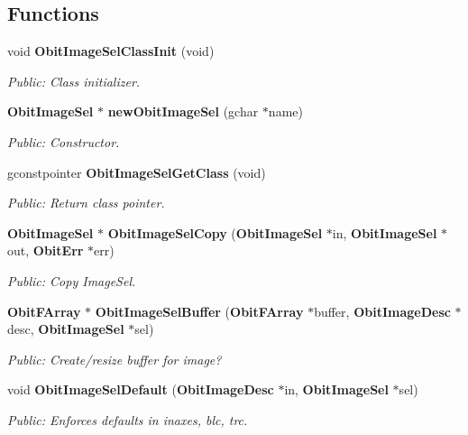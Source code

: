 \subsection*{Functions}
\begin{CompactItemize}
\item 
void {\bf Obit\-Image\-Sel\-Class\-Init} (void)
\begin{CompactList}\small\item\em Public: Class initializer. \item\end{CompactList}\item 
{\bf Obit\-Image\-Sel} $\ast$ {\bf new\-Obit\-Image\-Sel} (gchar $\ast$name)
\begin{CompactList}\small\item\em Public: Constructor. \item\end{CompactList}\item 
gconstpointer {\bf Obit\-Image\-Sel\-Get\-Class} (void)
\begin{CompactList}\small\item\em Public: Return class pointer. \item\end{CompactList}\item 
{\bf Obit\-Image\-Sel} $\ast$ {\bf Obit\-Image\-Sel\-Copy} ({\bf Obit\-Image\-Sel} $\ast$in, {\bf Obit\-Image\-Sel} $\ast$out, {\bf Obit\-Err} $\ast$err)
\begin{CompactList}\small\item\em Public: Copy Image\-Sel. \item\end{CompactList}\item 
{\bf Obit\-FArray} $\ast$ {\bf Obit\-Image\-Sel\-Buffer} ({\bf Obit\-FArray} $\ast$buffer, {\bf Obit\-Image\-Desc} $\ast$desc, {\bf Obit\-Image\-Sel} $\ast$sel)
\begin{CompactList}\small\item\em Public: Create/resize buffer for image? \item\end{CompactList}\item 
void {\bf Obit\-Image\-Sel\-Default} ({\bf Obit\-Image\-Desc} $\ast$in, {\bf Obit\-Image\-Sel} $\ast$sel)
\begin{CompactList}\small\item\em Public: Enforces defaults in inaxes, blc, trc. \item\end{CompactList}\item 

\end{CompactItemize}
